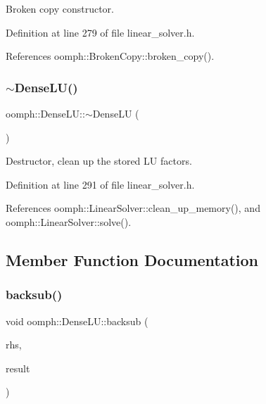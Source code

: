 Broken copy constructor. 



Definition at line 279 of file linear\+\_\+solver.\+h.



References oomph\+::\+Broken\+Copy\+::broken\+\_\+copy().

\mbox{\label{classoomph_1_1DenseLU_a012d934c8dec17f2ca3ad504939ab29d}} 
\subsubsection{\texorpdfstring{$\sim$\+Dense\+L\+U()}{~DenseLU()}}
{\footnotesize\ttfamily oomph\+::\+Dense\+L\+U\+::$\sim$\+Dense\+LU (\begin{DoxyParamCaption}{ }\end{DoxyParamCaption})\hspace{0.3cm}{\ttfamily [inline]}}



Destructor, clean up the stored LU factors. 



Definition at line 291 of file linear\+\_\+solver.\+h.



References oomph\+::\+Linear\+Solver\+::clean\+\_\+up\+\_\+memory(), and oomph\+::\+Linear\+Solver\+::solve().



\subsection{Member Function Documentation}
\mbox{\label{classoomph_1_1DenseLU_a4fc7e7a29cb86df73883df9c6a65600b}} 
\subsubsection{\texorpdfstring{backsub()}{backsub()}\hspace{0.1cm}{\footnotesize\ttfamily [1/2]}}
{\footnotesize\ttfamily void oomph\+::\+Dense\+L\+U\+::backsub (\begin{DoxyParamCaption}\item[{const \hyperlink{classoomph_1_1DoubleVector}{Double\+Vector} \&}]{rhs,  }\item[{\hyperlink{classoomph_1_1DoubleVector}{Double\+Vector} \&}]{result }\end{DoxyParamCaption})\hspace{0.3cm}{\ttfamily [protected]}}




